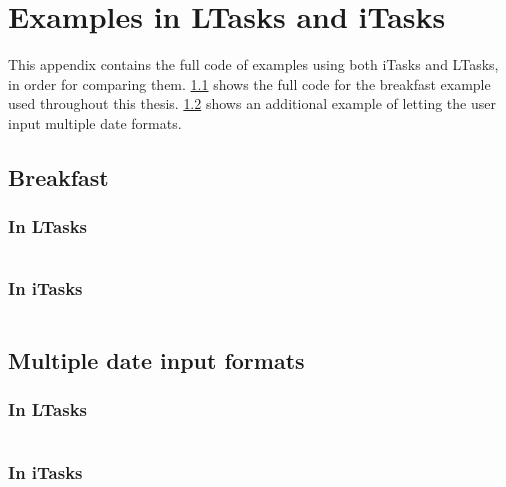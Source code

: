 \chapter{Examples in LTasks and iTasks}\label{appendix-examples}

This appendix contains the full code of examples using both iTasks and LTasks, in order for comparing them. \ref{appendix-breakfast} shows the full code for the breakfast example used throughout this thesis. \ref{appendix-dates} shows an additional example of letting the user input multiple date formats.

\section{Breakfast}\label{appendix-breakfast}
\subsection{In LTasks}\label{appendix-breakfast-ltasks}
\inputminted{lua}{examples/breakfast.lua}

\subsection{In iTasks}\label{appendix-breakfast-itasks}
\inputminted{clean}{examples/breakfast.icl}

\newpage
\section{Multiple date input formats}\label{appendix-dates}
\subsection{In LTasks}\label{appendix-dates-ltasks}
\inputminted{lua}{examples/date.lua}

\subsection{In iTasks}\label{appendix-dates-itasks}
\inputminted{clean}{examples/date.icl}
